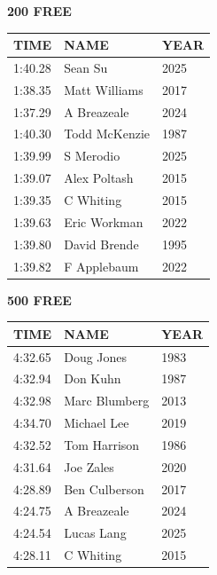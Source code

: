 \begin{table}[H]
\centering
\begin{minipage}[t]{0.48\textwidth}
\centering
\textbf{200 FREE}\\[0.1cm]
\begin{tabular}{@{}p{1.8cm}p{2.8cm}p{1.2cm}@{}}
\hline
    \textbf{TIME} & \textbf{NAME} & \textbf{YEAR} \\
\hline
    1:40.28 & Sean Su & 2025 \\
    1:38.35 & Matt Williams & 2017 \\
    1:37.29 & A Breazeale & 2024 \\
    1:40.30 & Todd McKenzie & 1987 \\
    1:39.99 & S Merodio & 2025 \\
    1:39.07 & Alex Poltash & 2015 \\
    1:39.35 & C Whiting & 2015 \\
    1:39.63 & Eric Workman & 2022 \\
    1:39.80 & David Brende & 1995 \\
    1:39.82 & F Applebaum & 2022 \\
\hline
\end{tabular}
\end{minipage}\hfill
\begin{minipage}[t]{0.48\textwidth}
\centering
\textbf{500 FREE}\\[0.1cm]
\begin{tabular}{@{}p{1.8cm}p{2.8cm}p{1.2cm}@{}}
\hline
    \textbf{TIME} & \textbf{NAME} & \textbf{YEAR} \\
\hline
    4:32.65 & Doug Jones & 1983 \\
    4:32.94 & Don Kuhn & 1987 \\
    4:32.98 & Marc Blumberg & 2013 \\
    4:34.70 & Michael Lee & 2019 \\
    4:32.52 & Tom Harrison & 1986 \\
    4:31.64 & Joe Zales & 2020 \\
    4:28.89 & Ben Culberson & 2017 \\
    4:24.75 & A Breazeale & 2024 \\
    4:24.54 & Lucas Lang & 2025 \\
    4:28.11 & C Whiting & 2015 \\
\hline
\end{tabular}
\end{minipage}
\end{table}

